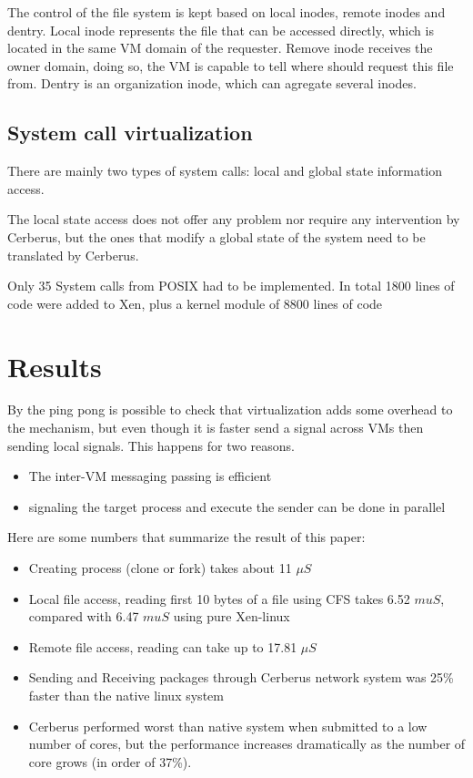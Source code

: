 \documentclass[journal]{IEEEtran}
\begin{document}
\begin{itemize}
	The control of the file system is kept based on local inodes, remote inodes and dentry. Local inode represents the file that can be accessed directly, which is located in the same VM domain of the requester. Remove inode receives the owner domain, doing so, the VM is capable to tell where should request this file from. Dentry is an organization inode, which can agregate several inodes.

	\subsection{System call virtualization}

	There are mainly two types of system calls: local and global state information access.
	
	The local state access does not offer any problem nor require any intervention by Cerberus, but the ones that modify a global state of the system need to be translated by Cerberus.
	
	Only 35 System calls from POSIX had to be implemented. In total 1800 lines of code were added to Xen, plus a kernel module of 8800 lines of code %
	
	\section{Results}
	
	By the ping pong is possible to check that virtualization adds some overhead to the mechanism, but even though it is faster send a signal across VMs then sending local signals. This happens for two reasons.
	\begin{itemize}
	\item The inter-VM messaging passing is efficient
	\item signaling the target process and execute the sender can be done in parallel
	\end{itemize}
	
	Here are some numbers that summarize the result of this paper:
	\begin{itemize}
	\item Creating process (clone or fork) takes about 11 $\mu S$ %
	\item Local file access, reading first 10 bytes of a file using CFS takes 6.52 $mu S$, compared with 6.47 $mu S$ using pure Xen-linux
	\item Remote file access, reading can take up to 17.81 $\mu S$
	\item Sending and Receiving packages through Cerberus network system was 25\% faster than the native linux system
	\item Cerberus performed worst than native system when submitted to a low number of cores, but the performance increases dramatically as the number of core grows (in order of 37\%).
	\end{itemize}

\end{itemize}
\end{document}
